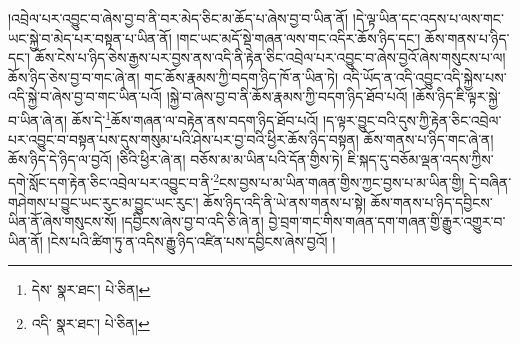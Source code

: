 །འབྲེལ་པར་འབྱུང་བ་ཞེས་བྱ་བ་ནི་བར་མེད་ཅིང་མ་ཆོད་པ་ཞེས་བྱ་བ་ཡིན་ནོ། །དེ་ལྟ་ཡིན་དང་འདས་པ་ལས་གང་ཡང་སྐྱེ་བ་མེད་པར་བསྟན་པ་ཡིན་ནོ། །གང་ཡང་མདོ་སྡེ་གཞན་ལས་གང་འདིར་ཆོས་ཉིད་དང་། ཆོས་གནས་པ་ཉིད་དང་། ཆོས་ངེས་པ་ཉིད་ཅེས་རྒྱས་པར་བྱས་ནས་འདི་ནི་རྟེན་ཅིང་འབྲེལ་པར་འབྱུང་བ་ཞེས་བྱའོ་ཞེས་གསུངས་པ་ལ། ཆོས་ཉིད་ཅེས་བྱ་བ་གང་ཞེ་ན། གང་ཆོས་རྣམས་ཀྱི་བདག་ཉིད་ཁོ་ན་ཡིན་ཏེ། འདི་ཡོད་ན་འདི་འབྱུང་འདི་སྐྱེས་པས་འདི་སྐྱེ་བ་ཞེས་བྱ་བ་གང་ཡིན་པའོ། །སྐྱེ་བ་ཞེས་བྱ་བ་ནི་ཆོས་རྣམས་ཀྱི་བདག་ཉིད་ཐོབ་པའོ། །ཆོས་ཉིད་ཇི་ལྟར་སྐྱེ་བ་ཡིན་ཞེ་ན། ཆོས་དེ་\footnote{དེས་  སྣར་ཐང་།  པེ་ཅིན། }ཆོས་གཞན་ལ་བརྟེན་ནས་བདག་ཉིད་ཐོབ་པའོ། །ད་ལྟར་བྱུང་བའི་དུས་ཀྱི་རྟེན་ཅིང་འབྲེལ་པར་འབྱུང་བ་བསྟན་པས་དུས་གསུམ་པའི་ཤེས་པར་བྱ་བའི་ཕྱིར་ཆོས་ཉིད་བསྟན། ཆོས་གནས་པ་ཉིད་གང་ཞེ་ན། ཆོས་ཉིད་དེ་ཉིད་ལ་བྱའོ། །ཅིའི་ཕྱིར་ཞེ་ན། བཅོས་མ་མ་ཡིན་པའི་དོན་གྱིས་ཏེ། ཇི་སྐད་དུ་བཅོམ་ལྡན་འདས་ཀྱིས་དགེ་སློང་དག་རྟེན་ཅིང་འབྲེལ་པར་འབྱུང་བ་ནི་\footnote{འདི་  སྣར་ཐང་།  པེ་ཅིན། }ངས་བྱས་པ་མ་ཡིན་གཞན་གྱིས་ཀྱང་བྱས་པ་མ་ཡིན་གྱི། དེ་བཞིན་གཤེགས་པ་བྱུང་ཡང་རུང་མ་བྱུང་ཡང་རུང་། ཆོས་ཉིད་འདི་ནི་ཡེ་ནས་གནས་པ་སྟེ། ཆོས་གནས་པ་ཉིད་དབྱིངས་ཡིན་ནོ་ཞེས་གསུངས་སོ། །དབྱིངས་ཞེས་བྱ་བ་འདི་ཅི་ཞེ་ན། བྱེ་བྲག་གང་གིས་གཞན་དག་གཞན་གྱི་རྒྱུར་འགྱུར་བ་ཡིན་ནོ། །ངེས་པའི་ཚིག་ཏུ་ན་འདིས་རྒྱུ་ཉིད་འཛིན་པས་དབྱིངས་ཞེས་བྱའོ། །
